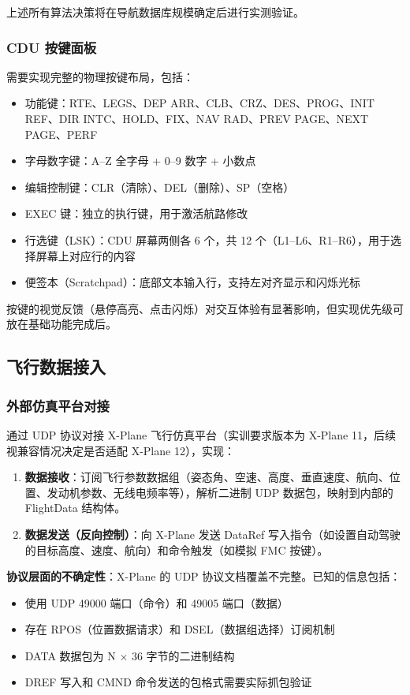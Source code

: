 \documentclass[12pt,a4paper]{ctexart}
\begin{document}
上述所有算法决策将在导航数据库规模确定后进行实测验证。

\subsubsection{CDU 按键面板}

需要实现完整的物理按键布局，包括：
\begin{itemize}
    \item 功能键：RTE、LEGS、DEP ARR、CLB、CRZ、DES、PROG、INIT REF、DIR INTC、HOLD、FIX、NAV RAD、PREV PAGE、NEXT PAGE、PERF
    \item 字母数字键：A--Z 全字母 + 0--9 数字 + 小数点
    \item 编辑控制键：CLR（清除）、DEL（删除）、SP（空格）
    \item EXEC 键：独立的执行键，用于激活航路修改
    \item 行选键（LSK）：CDU 屏幕两侧各 6 个，共 12 个（L1--L6、R1--R6），用于选择屏幕上对应行的内容
    \item 便签本（Scratchpad）：底部文本输入行，支持左对齐显示和闪烁光标
\end{itemize}

按键的视觉反馈（悬停高亮、点击闪烁）对交互体验有显著影响，但实现优先级可放在基础功能完成后。

\subsection{飞行数据接入}

\subsubsection{外部仿真平台对接}

通过 UDP 协议对接 X-Plane 飞行仿真平台（实训要求版本为 X-Plane 11，后续视兼容情况决定是否适配 X-Plane 12），实现：

\begin{enumerate}[leftmargin=*]
    \item \textbf{数据接收}：订阅飞行参数数据组（姿态角、空速、高度、垂直速度、航向、位置、发动机参数、无线电频率等），解析二进制 UDP 数据包，映射到内部的 FlightData 结构体。
    \item \textbf{数据发送（反向控制）}：向 X-Plane 发送 DataRef 写入指令（如设置自动驾驶的目标高度、速度、航向）和命令触发（如模拟 FMC 按键）。
\end{enumerate}

\textbf{协议层面的不确定性}：X-Plane 的 UDP 协议文档覆盖不完整。已知的信息包括：
\begin{itemize}
    \item 使用 UDP 49000 端口（命令）和 49005 端口（数据）
    \item 存在 RPOS（位置数据请求）和 DSEL（数据组选择）订阅机制
    \item DATA 数据包为 N $\times$ 36 字节的二进制结构
    \item DREF 写入和 CMND 命令发送的包格式需要实际抓包验证
\end{itemize}
\end{document}
